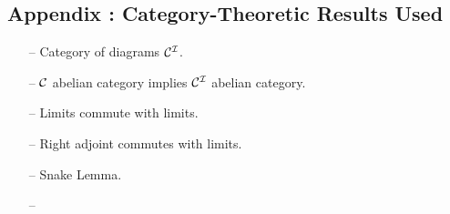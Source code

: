 \subsection{Appendix : Category-Theoretic Results Used}

\begin{itemize}
  \item[--] Category of diagrams $\mathcal{C}^{\mathcal{I}}$.
  \item[--] $\mathcal{C}$ abelian category implies $\mathcal{C}^{\mathcal{I}}$ abelian category. 
  \item[--] Limits commute with limits. 
  \item[--] Right adjoint commutes with limits. 
  \item[--] Snake Lemma. 
  \item[--]  
\end{itemize}